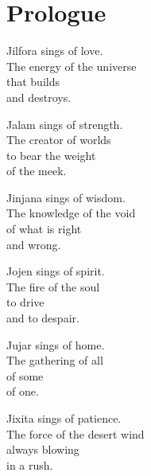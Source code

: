 
\chapter{Prologue}

\begin{singlespace}
\noindent Jilfora sings of love. \\
The energy of the universe \\
that builds \\
and destroys.
\end{singlespace}
\vspace{1.0em}

\begin{singlespace}
\noindent Jalam sings of strength. \\
The creator of worlds \\
to bear the weight \\
of the meek.
\end{singlespace}
\vspace{1.0em}

\begin{singlespace}
\noindent Jinjana sings of wisdom. \\
The knowledge of the void \\
of what is right \\
and wrong.
\end{singlespace}
\vspace{1.0em}

\begin{singlespace}
\noindent Jojen sings of spirit. \\
The fire of the soul \\
to drive \\
and to despair.
\end{singlespace}
\vspace{1.0em}

\begin{singlespace}
\noindent Jujar sings of home. \\
The gathering of all \\
of some \\
of one.
\end{singlespace}
\vspace{1.0em}

\begin{singlespace}
\noindent Jixita sings of patience. \\
The force of the desert wind \\
always blowing \\
in a rush.
\end{singlespace}
\vspace{1.0em}

